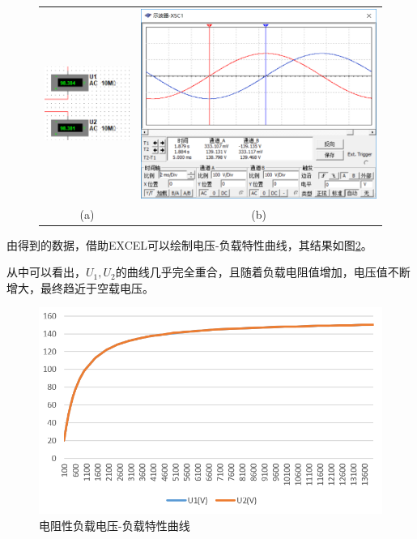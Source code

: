 \documentclass[12pt]{article}%
\begin{document}
\begin{figure}[htbp]
\centering
\begin{tabular}{cc}
\includegraphics[width=0.45\linewidth]{TIM20180531171612.png}&
\includegraphics[width=0.45\linewidth]{TIM20180531171724.png}\\
(a)&(b)\\
\end{tabular}
\caption{\heiti{}}\label{fig:x1}
\end{figure}

由得到的数据，借助EXCEL可以绘制电压-负载特性曲线，其结果如图\ref{fig:a11}。\par
从中可以看出，$U_1,U_2$的曲线几乎完全重合，且随着负载电阻值增加，电压值不断增大，最终趋近于空载电压。
\begin{figure}[htbp]
\centering\includegraphics[width=0.8\linewidth]{TIM20180531191154.png}
\caption{\heiti{}电阻性负载电压-负载特性曲线}\label{fig:a11}
\end{figure}
\end{document}
